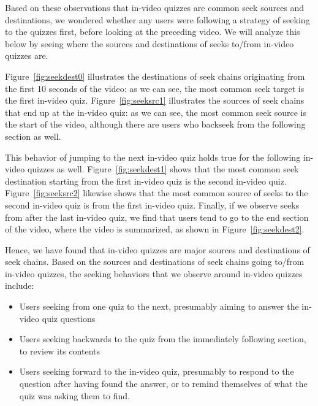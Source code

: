 \documentclass[letterpaper]{article}
\begin{document}
Based on these observations that in-video quizzes are common seek sources and destinations, we wondered whether any users were following a strategy of seeking to the quizzes first, before looking at the preceding video. We will analyze this below by seeing where the sources and destinations of seeks to/from in-video quizzes are.


Figure~\ref{fig:seekdest0} illustrates the destinations of seek chains originating from the first 10 seconds of the video: as we can see, the most common seek target is the first in-video quiz. Figure~\ref{fig:seeksrc1} illustrates the sources of seek chains that end up at the in-video quiz: as we can see, the most common seek source is the start of the video, although there are users who backseek from the following section as well.

This behavior of jumping to the next in-video quiz holds true for the following in-video quizzes as well. Figure~\ref{fig:seekdest1} shows that the most common seek destination starting from the first in-video quiz is the second in-video quiz. Figure~\ref{fig:seeksrc2} likewise shows that the most common source of seeks to the second in-video quiz is from the first in-video quiz. Finally, if we observe seeks from after the last in-video quiz, we find that users tend to go to the end section of the video, where the video is summarized, as shown in Figure~\ref{fig:seekdest2}.

Hence, we have found that in-video quizzes are major sources and destinations of seek chains. Based on the sources and destinations of seek chains going to/from in-video quizzes, the seeking behaviors that we observe around in-video quizzes include:

\begin{itemize}
\item Users seeking from one quiz to the next, presumably aiming to answer the in-video quiz questions
\item Users seeking backwards to the quiz from the immediately following section, to review its contents
\item Users seeking forward to the in-video quiz, presumably to respond to the question after having found the answer, or to remind themselves of what the quiz was asking them to find.
\end{itemize}
\end{document}
